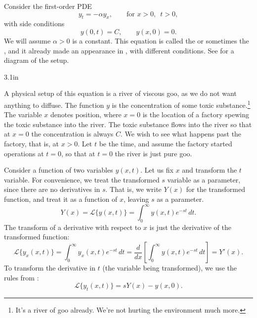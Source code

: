 \begin{example}
Consider the first-order PDE
\begin{equation*}
y_t = - \alpha y_x, \qquad \text{for } x > 0, \enspace t > 0,
\end{equation*}
with side conditions
\begin{equation*}
y(0,t) = C, \qquad y(x,0) = 0 .
\end{equation*}
We will assume $\alpha > 0$ is a constant.
This equation is 
called the \emph{} or sometimes
the \emph{}, and it already made
an appearance in , with different conditions.
See  for a diagram of the setup.

\begin{mywrapfig}{3.1in}
\capstart
{}
\caption{Transport equation on a half line.\label{lt:half-infinite-goo-river}}
\end{mywrapfig}

A physical setup of this equation is a river of viscous goo,
as we do not want anything to diffuse.  The function
$y$ is the concentration of
some toxic substance.\footnote{It's a river of goo already.
We're not hurting the environment much more.}
The variable $x$ denotes position, where $x=0$
is the location of a factory spewing the toxic substance into the
river.  The toxic substance flows into the river so that at $x=0$ the
concentration is always $C$.  We wish to see what happens past the factory,
that is, at $x > 0$.  Let $t$ be the time, and assume
the factory started operations at $t=0$, so that at $t=0$ the river is just
pure goo.

Consider a function of two variables $y(x,t)$.
Let us fix $x$ and transform the $t$ variable.
For convenience, we treat the transformed $s$
variable as a parameter, since there are no derivatives in $s$.
That is, we write $Y(x)$ for the transformed function,
and treat it as a function of $x$, leaving $s$ as a parameter.
\begin{equation*}
Y(x)
= {\mathcal L} \bigl\{ y(x,t) \bigr\}
= \int_0^\infty y(x,t) e^{-st} \,dt .
\end{equation*}
The transform of a derivative with respect to $x$ is just the derivative of 
the transformed function:
\begin{equation*}
{\mathcal L} \bigl\{ y_x(x,t) \bigr\} =
\int_0^\infty y_x(x,t) e^{-st} \,dt
=
\frac{d}{dx} \left[\int_0^\infty y(x,t) e^{-st} \,dt \right]
=
Y'(x) .
\end{equation*}
To transform the derivative in $t$ (the variable being transformed),
we use the rules from :
\begin{equation*}
{\mathcal L} \bigl\{ y_t(x,t) \bigr\} 
=
sY(x) - y(x,0) .
\end{equation*}


\end{example}

